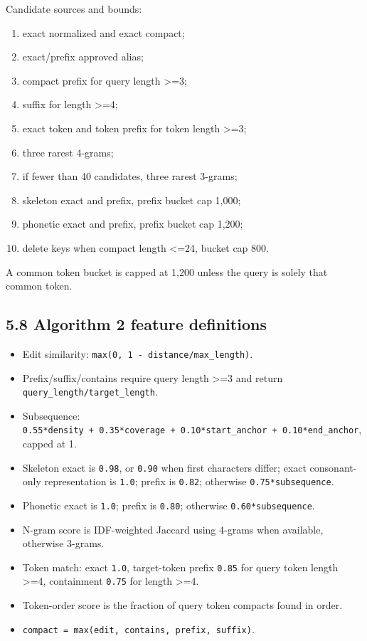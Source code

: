 Candidate sources and bounds:

\begin{enumerate}
\def\labelenumi{\arabic{enumi}.}
\tightlist
\item
  exact normalized and exact compact;
\item
  exact/prefix approved alias;
\item
  compact prefix for query length \textgreater=3;
\item
  suffix for length \textgreater=4;
\item
  exact token and token prefix for token length \textgreater=3;
\item
  three rarest 4-grams;
\item
  if fewer than 40 candidates, three rarest 3-grams;
\item
  skeleton exact and prefix, prefix bucket cap 1,000;
\item
  phonetic exact and prefix, prefix bucket cap 1,200;
\item
  delete keys when compact length \textless=24, bucket cap 800.
\end{enumerate}

A common token bucket is capped at 1,200 unless the query is solely that common token.

\subsection{5.8 Algorithm 2 feature definitions}\label{58-algorithm-2-feature-definitions}

\begin{itemize}
\tightlist
\item
  Edit similarity: \texttt{max(0,\ 1\ -\ distance/max\_\allowbreak{}length)}.
\item
  Prefix/suffix/contains require query length \textgreater=3 and return \texttt{query\_\allowbreak{}length/target\_\allowbreak{}length}.
\item
  Subsequence: \texttt{0.55*density\ +\ 0.35*coverage\ +\ 0.10*start\_\allowbreak{}anchor\ +\ 0.10*end\_\allowbreak{}anchor}, capped at 1.
\item
  Skeleton exact is \texttt{0.98}, or \texttt{0.90} when first characters differ; exact consonant-only representation is \texttt{1.0}; prefix is \texttt{0.82}; otherwise \texttt{0.75*subsequence}.
\item
  Phonetic exact is \texttt{1.0}; prefix is \texttt{0.80}; otherwise \texttt{0.60*subsequence}.
\item
  N-gram score is IDF-weighted Jaccard using 4-grams when available, otherwise 3-grams.
\item
  Token match: exact \texttt{1.0}, target-token prefix \texttt{0.85} for query token length \textgreater=4, containment \texttt{0.75} for length \textgreater=4.
\item
  Token-order score is the fraction of query token compacts found in order.
\item
  \texttt{compact\ =\ max(edit,\ contains,\ prefix,\ suffix)}.
\end{itemize}

